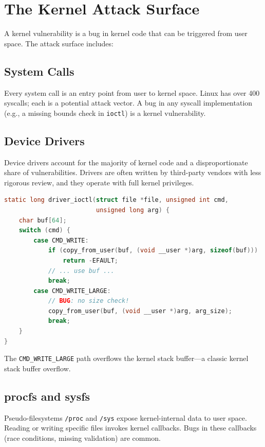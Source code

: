 \section{The Kernel Attack Surface}

A kernel vulnerability is a bug in kernel code that can be triggered from user space. The attack surface includes:

\subsection{System Calls}

Every system call is an entry point from user to kernel space. Linux has over 400 syscalls; each is a potential attack vector. A bug in any syscall implementation (e.g., a missing bounds check in \texttt{ioctl}) is a kernel vulnerability.

\subsection{Device Drivers}

Device drivers account for the majority of kernel code and a disproportionate share of vulnerabilities. Drivers are often written by third-party vendors with less rigorous review, and they operate with full kernel privileges.

\begin{lstlisting}[language=C, caption=Simplified vulnerable driver ioctl]
static long driver_ioctl(struct file *file, unsigned int cmd,
                         unsigned long arg) {
    char buf[64];
    switch (cmd) {
        case CMD_WRITE:
            if (copy_from_user(buf, (void __user *)arg, sizeof(buf)))
                return -EFAULT;
            // ... use buf ...
            break;
        case CMD_WRITE_LARGE:
            // BUG: no size check!
            copy_from_user(buf, (void __user *)arg, arg_size);
            break;
    }
}
\end{lstlisting}

The \texttt{CMD\_WRITE\_LARGE} path overflows the kernel stack buffer---a classic kernel stack buffer overflow.

\subsection{procfs and sysfs}

Pseudo-filesystems \texttt{/proc} and \texttt{/sys} expose kernel-internal data to user space. Reading or writing specific files invokes kernel callbacks. Bugs in these callbacks (race conditions, missing validation) are common.

